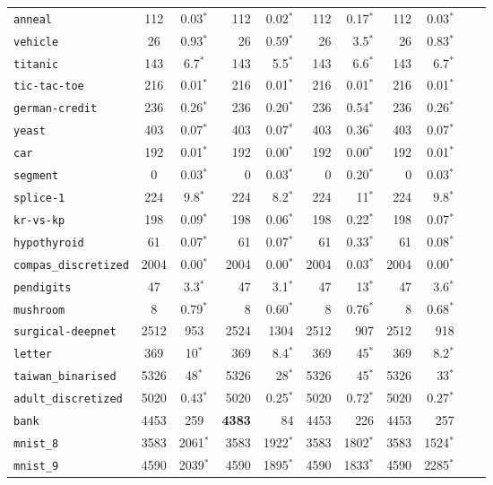 \begin{tabular}{lccrrrrrrrr}
\texttt{anneal} & 112 & 0.03$^*$ & 112 & 0.02$^*$ & 112 & 0.17$^*$ & 112 & 0.03$^*$\\
\texttt{vehicle} & 26 & 0.93$^*$ & 26 & 0.59$^*$ & 26 & 3.5$^*$ & 26 & 0.83$^*$\\
\texttt{titanic} & 143 & 6.7$^*$ & 143 & 5.5$^*$ & 143 & 6.6$^*$ & 143 & 6.7$^*$\\
\texttt{tic-tac-toe} & 216 & 0.01$^*$ & 216 & 0.01$^*$ & 216 & 0.01$^*$ & 216 & 0.01$^*$\\
\texttt{german-credit} & 236 & 0.26$^*$ & 236 & 0.20$^*$ & 236 & 0.54$^*$ & 236 & 0.26$^*$\\
\texttt{yeast} & 403 & 0.07$^*$ & 403 & 0.07$^*$ & 403 & 0.36$^*$ & 403 & 0.07$^*$\\
\texttt{car} & 192 & 0.01$^*$ & 192 & 0.00$^*$ & 192 & 0.00$^*$ & 192 & 0.01$^*$\\
\texttt{segment} & 0 & 0.03$^*$ & 0 & 0.03$^*$ & 0 & 0.20$^*$ & 0 & 0.03$^*$\\
\texttt{splice-1} & 224 & 9.8$^*$ & 224 & 8.2$^*$ & 224 & 11$^*$ & 224 & 9.8$^*$\\
\texttt{kr-vs-kp} & 198 & 0.09$^*$ & 198 & 0.06$^*$ & 198 & 0.22$^*$ & 198 & 0.07$^*$\\
\texttt{hypothyroid} & 61 & 0.07$^*$ & 61 & 0.07$^*$ & 61 & 0.33$^*$ & 61 & 0.08$^*$\\
\texttt{compas\_discretized} & 2004 & 0.00$^*$ & 2004 & 0.00$^*$ & 2004 & 0.03$^*$ & 2004 & 0.00$^*$\\
\texttt{pendigits} & 47 & 3.3$^*$ & 47 & 3.1$^*$ & 47 & 13$^*$ & 47 & 3.6$^*$\\
\texttt{mushroom} & 8 & 0.79$^*$ & 8 & 0.60$^*$ & 8 & 0.76$^*$ & 8 & 0.68$^*$\\
\texttt{surgical-deepnet} & 2512 & 953 & 2524 & 1304 & 2512 & 907 & 2512 & 918\\
\texttt{letter} & 369 & 10$^*$ & 369 & 8.4$^*$ & 369 & 45$^*$ & 369 & 8.2$^*$\\
\texttt{taiwan\_binarised} & 5326 & 48$^*$ & 5326 & 28$^*$ & 5326 & 45$^*$ & 5326 & 33$^*$\\
\texttt{adult\_discretized} & 5020 & 0.43$^*$ & 5020 & 0.25$^*$ & 5020 & 0.72$^*$ & 5020 & 0.27$^*$\\
\texttt{bank} & 4453 & 259 & \textbf{4383} & 84 & 4453 & 226 & 4453 & 257\\
\texttt{mnist\_8} & 3583 & 2061$^*$ & 3583 & 1922$^*$ & 3583 & 1802$^*$ & 3583 & 1524$^*$\\
\texttt{mnist\_9} & 4590 & 2039$^*$ & 4590 & 1895$^*$ & 4590 & 1833$^*$ & 4590 & 2285$^*$\\

\end{tabular}
